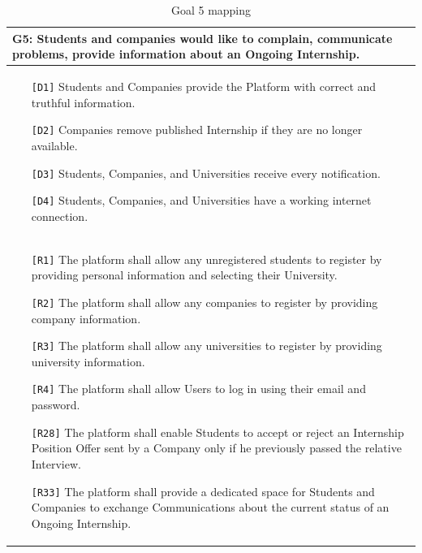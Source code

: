 \begin{table}[H]
    \centering
    \begin{tabular}{|p{15cm}|}
        \hline
        \textbf{G5:} Students and companies would like to complain, communicate problems, provide information about an Ongoing Internship. \\ \hline
        \begin{itemize}
            \item[\texttt{[D1]}] Students and Companies provide the Platform with correct and truthful information.
            \item[\texttt{[D2]}] Companies remove published Internship if they are no longer available.
            \item[\texttt{[D3]}] Students, Companies, and Universities receive every notification.
            \item[\texttt{[D4]}] Students, Companies, and Universities have a working internet connection.
        \end{itemize} \\ \hline
        \begin{itemize}
            \item[\texttt{[R1]}] The platform shall allow any unregistered students to register by providing personal information and selecting their University.
            \item[\texttt{[R2]}] The platform shall allow any companies to register by providing company information.
            \item[\texttt{[R3]}] The platform shall allow any universities to register by providing university information.
            \item[\texttt{[R4]}] The platform shall allow Users to log in using their email and password.
            \item[\texttt{[R28]}] The platform shall enable Students to accept or reject an Internship Position Offer sent by a Company only if he previously passed the relative Interview.
            \item[\texttt{[R33]}] The platform shall provide a dedicated space for Students and Companies to exchange Communications about the current status of an Ongoing Internship.
        \end{itemize} \\ \hline
    \end{tabular}
    \caption{Goal 5 mapping}
    \label{tab:G5}
\end{table}

